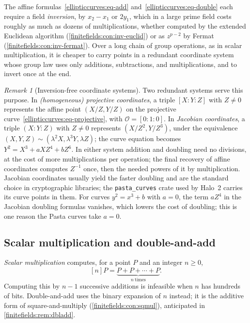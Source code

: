 \documentclass[11pt,a4paper]{article}
\theoremstyle{definition}
\theoremstyle{remark}
\newtheorem{remark}[theorem]{Remark}
\begin{document}
The affine formulas~\eqref{ellipticcurves:eq-add}
and~\eqref{ellipticcurves:eq-double} each require a field
\emph{inversion}, by \(x_2 - x_1\) or \(2y_1\), which in a large prime
field costs roughly as much as dozens of multiplications, whether computed
by the extended Euclidean algorithm (\cref{finitefields:con:inv-euclid})
or as \(z^{p-2}\) by Fermat (\cref{finitefields:con:inv-fermat}). Over a
long chain of group operations, as in scalar multiplication, it is cheaper
to carry points in a redundant coordinate system whose group law uses only
additions, subtractions, and multiplications, and to invert once at the
end.

\begin{remark}[Inversion-free coordinate systems]
\label{ellipticcurves:rem-coords}
Two redundant systems serve this purpose. In \emph{(homogeneous)
projective coordinates}, a triple \([X : Y : Z]\) with \(Z \neq 0\)
represents the affine point \((X/Z, Y/Z)\) on the projective
curve~\eqref{ellipticcurves:eq-projective}, with
\(\mathcal{O} = [0 : 1 : 0]\). In \emph{Jacobian coordinates}, a triple
\((X : Y : Z)\) with \(Z \neq 0\) represents \((X/Z^2, Y/Z^3)\), under
the equivalence
\((X, Y, Z) \sim (\lambda^2 X, \lambda^3 Y, \lambda Z)\); the curve
equation becomes \(Y^2 = X^3 + a X Z^4 + b Z^6\). In either system
addition and doubling need no divisions, at the cost of more
multiplications per operation; the final recovery of affine coordinates
computes \(Z^{-1}\) once, then the needed powers of it by multiplication.
Jacobian coordinates usually yield the faster doubling and are the
standard choice in cryptographic libraries; the \texttt{pasta\_curves}
crate used by Halo~2 carries its curve points in them. For curves
\(y^2 = x^3 + b\) with \(a = 0\), the term \(a Z^4\) in the Jacobian
doubling formulas vanishes, which lowers the cost of doubling; this is
one reason the Pasta curves take \(a = 0\).
\end{remark}

\subsection{Scalar multiplication and double-and-add}
\label{ellipticcurves:subsec-dbladd}

\emph{Scalar multiplication} computes, for a point \(P\) and an integer
\(n \geq 0\),
\[
  [n]P = \underbrace{P + P + \cdots + P}_{n\ \text{times}} .
\]
Computing this by \(n - 1\) successive additions is infeasible when
\(n\) has hundreds of bits. Double-and-add uses the binary expansion of
\(n\) instead; it is the additive form of square-and-multiply
(\cref{finitefields:con:sqmul}), anticipated in
\cref{finitefields:rem:dbladd}.
\end{document}
